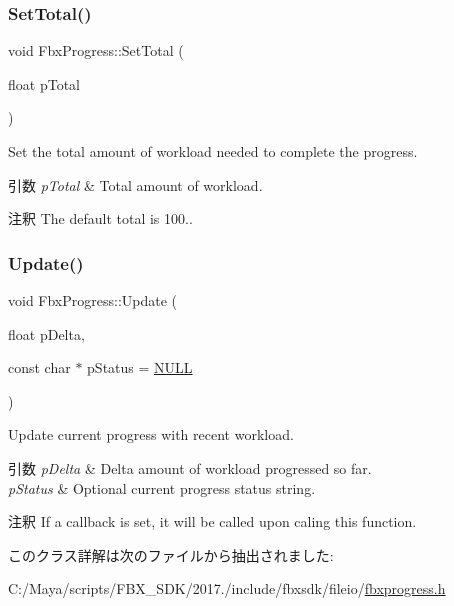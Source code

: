 \subsubsection{\texorpdfstring{Set\+Total()}{SetTotal()}}
{\footnotesize\ttfamily void Fbx\+Progress\+::\+Set\+Total (\begin{DoxyParamCaption}\item[{float}]{p\+Total }\end{DoxyParamCaption})}

Set the total amount of workload needed to complete the progress. 
\begin{DoxyParams}{引数}
{\em p\+Total} & Total amount of workload. \\
\hline
\end{DoxyParams}
\begin{DoxyRemark}{注釈}
The default total is 100.. 
\end{DoxyRemark}
\mbox{\label{class_fbx_progress_ac67f9c160f7ffc09e9c7454b3bfa6b06}} 
\subsubsection{\texorpdfstring{Update()}{Update()}}
{\footnotesize\ttfamily void Fbx\+Progress\+::\+Update (\begin{DoxyParamCaption}\item[{float}]{p\+Delta,  }\item[{const char $\ast$}]{p\+Status = {\ttfamily \hyperlink{fbxarch_8h_a070d2ce7b6bb7e5c05602aa8c308d0c4}{N\+U\+LL}} }\end{DoxyParamCaption})}

Update current progress with recent workload. 
\begin{DoxyParams}{引数}
{\em p\+Delta} & Delta amount of workload progressed so far. \\
\hline
{\em p\+Status} & Optional current progress status string. \\
\hline
\end{DoxyParams}
\begin{DoxyRemark}{注釈}
If a callback is set, it will be called upon caling this function. 
\end{DoxyRemark}


このクラス詳解は次のファイルから抽出されました\+:\begin{DoxyCompactItemize}
\item 
C\+:/\+Maya/scripts/\+F\+B\+X\+\_\+\+S\+D\+K/2017./include/fbxsdk/fileio/\hyperlink{fbxprogress_8h}{fbxprogress.\+h}\end{DoxyCompactItemize}
